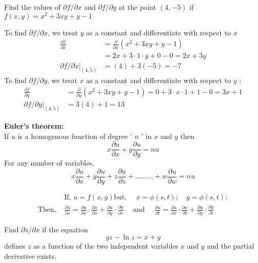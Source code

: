 \begin{exercise}
	Find the values of $\partial f / \partial x$ and $\partial f / \partial y$ at the point $(4,-5)$ if
	$f(x, y)=x^{2}+3 x y+y-1$
\end{exercise}
\begin{answer}
	 To find $\partial f / \partial x$, we treat $y$ as a constant and differentiate with respect to $x$
	 \begin{align*}
	 \frac{\partial f}{\partial x}&=\frac{\partial}{\partial x}\left(x^{2}+3 x y+y-1\right)\\&=2 x+3 \cdot 1 \cdot y+0-0=2 x+3 y\\
	 \partial f / \partial x|_{(4,5)} &=
	 	(4)+3(-5)=-7
	 \end{align*}
To find $\partial f / \partial y$, we treat $x$ as a constant and differentiate with respect to $y$ :
	\begin{align*}
\frac{\partial f}{\partial y}&=\frac{\partial}{\partial y}\left(x^{2}+3 x y+y-1\right)=0+3 \cdot x \cdot 1+1-0=3 x+1\\
\partial f / \partial y|_{(4,5)}&= 3(4)+1=13
	\end{align*}
	
\end{answer}
\begin{theorem}
	\textbf{Euler's theorem:} \\If $u$ is a homogenous function of degree ' $n$ ' in $x$ and $y$ then
	$$
	x \frac{\partial u}{\partial x}+y \frac{\partial u}{\partial y}=n u
	$$
	For any number of variables,
	$$
	x \frac{\partial u}{\partial x}+y \frac{\partial u}{\partial y}+z \frac{\partial u}{\partial z}+\ldots \ldots \ldots+w \frac{\partial u}{\partial w}=n u
	$$
\end{theorem}
\begin{note}
	\begin{align*}
		&\text{If, }u=f(x, y) \text{but, } \quad x=\phi(s, t); \quad y=\phi(s, t);\\
		\text{Then, }&\frac{\partial u}{\partial s}=\frac{\partial u}{\partial x} \cdot \frac{\partial x}{\partial s}+\frac{\partial u}{\partial y} \cdot \frac{\partial y}{\partial s}\quad \text { and }\quad \frac{\partial u}{\partial t}=\frac{\partial u}{\partial x} \cdot \frac{\partial x}{\partial t}+\frac{\partial u}{\partial y} \cdot \frac{\partial y}{\partial t}
	\end{align*}
\end{note}
\begin{exercise}
	Find $\partial z / \partial x$ if the equation
	$$
	y z-\ln z=x+y
	$$
	defines $z$ as a function of the two independent variables $x$ and $y$ and the partial derivative exists.
\end{exercise}

